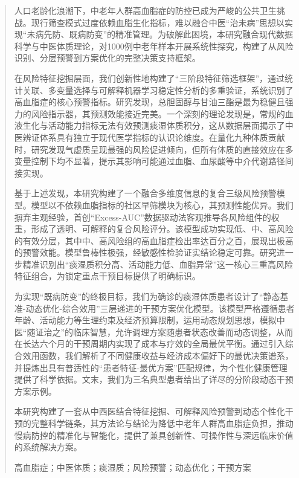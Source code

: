 \documentclass[12pt,a4paper]{ctexart}
\begin{document}
\vspace{-6em} %
\begin{abstract}
    \songti{} %
人口老龄化浪潮下，中老年人群高血脂症的防控已成为严峻的公共卫生挑战。现行筛查模式过度依赖血脂生化指标，难以融合中医“治未病”思想以实现“未病先防、既病防变”的精准管理。为破解此困境，本研究融合现代数据科学与中医体质理论，对1000例中老年样本开展系统性探究，构建了从风险识别、分层预警到方案优化的完整决策支持框架。

在风险特征挖掘层面，我们创新性地构建了“三阶段特征筛选框架”，通过统计关联、多变量选择与可解释机器学习稳定性分析的多重验证，系统识别了高血脂症的核心预警指标。研究发现，总胆固醇与甘油三酯是最为稳健且强力的风险指示器，其预测效能接近完美。一个深刻的理论发现是，常规的血液生化与活动能力指标无法有效预测痰湿体质积分，这从数据层面揭示了中医辨证体系具有独立于现代医学指标的认识论维度。在量化九种体质贡献时，研究发现气虚质呈现最强的风险促进倾向，但所有体质的直接效应在多变量控制下均不显著，提示其影响可能通过血脂、血尿酸等中介代谢路径间接实现。

基于上述发现，本研究构建了一个融合多维度信息的复合三级风险预警模型。模型以不依赖血脂指标的社区早筛模块为核心，其预测性能优异。我们摒弃主观经验，首创“Excess-AUC”数据驱动法客观推导各风险组件的权重，形成了透明、可解释的复合风险评分。该模型成功实现低、中、高风险的有效分层，其中中、高风险组的高血脂症检出率达百分之百，展现出极高的预警效能。模型鲁棒性极强，经敏感性检验证实结论稳定可靠。研究进一步精准识别出“痰湿质积分高、活动能力低、血脂异常”这一核心三重高风险特征组合，为锁定重点干预目标提供了明确标识。

为实现“既病防变”的终极目标，我们为确诊的痰湿体质患者设计了“静态基准-动态优化-综合效用”三层递进的干预方案优化模型。该模型严格遵循患者年龄、活动能力等生理约束及经济预算限制，运用动态规划思想，模拟中医“随证治之”的临床智慧，允许调理方案随患者状态改善而动态调整，从而在长达六个月的干预周期内实现了成本与疗效的全局最优平衡。通过引入综合效用函数，我们解析了不同健康收益与经济成本偏好下的最优决策谱系，并提炼出具有普适性的“患者特征-最优方案”匹配规律，为个性化健康管理提供了科学依据。文末，我们为三名典型患者给出了详尽的分阶段动态干预方案示例。

本研究构建了一套从中西医结合特征挖掘、可解释风险预警到动态个性化干预的完整科学链条，其方法论与结论为降低中老年人群高血脂症负担，推动慢病防控的精准化与智能化，提供了兼具创新性、可操作性与深远临床价值的系统解决方案。
    
    \vspace{0.8em}
     {\songti{} 
    高血脂症；中医体质；痰湿质；风险预警；动态优化；干预方案}
\end{abstract}
\end{document}
